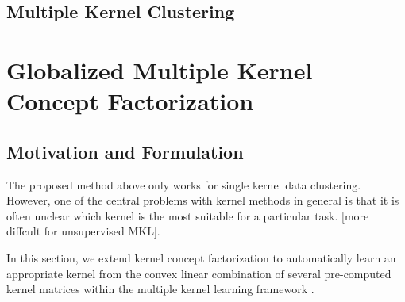 \documentclass[10pt,journal,compsoc]{IEEEtran}
\begin{document}
\subsection{Multiple Kernel Clustering}

\section{Globalized Multiple Kernel Concept Factorization}
\subsection{Motivation and Formulation}

The proposed method above only works for single kernel data clustering. However, one of the central problems with kernel methods in general is that it is often unclear which kernel is the most suitable for a particular task. [more diffcult for unsupervised MKL].

In this section, we extend kernel concept factorization to automatically learn an appropriate kernel from the convex linear combination of several pre-computed kernel matrices within the multiple kernel learning framework \cite{gonen2011multiple}.
\end{document}
